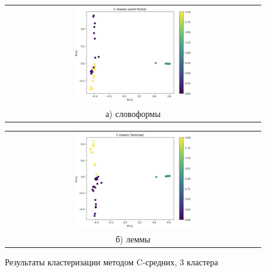 \begin{figure}
	\begin{tabular}[b]{c}
		\includegraphics[width=0.475\textwidth]{images/3.png} \\
		\small а) словоформы
	\end{tabular}
	\begin{tabular}[b]{c}
		\includegraphics[width=0.475\textwidth]{images/4.png} \\
		\small б) леммы
	\end{tabular}
	\caption{Результаты кластеризации методом C-средних, 3 кластера}
	\label{img:2}
\end{figure}

